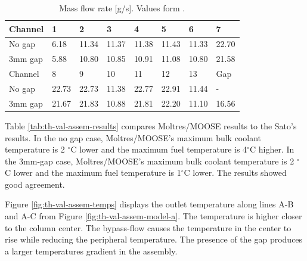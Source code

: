 
\begin{table}[htbp!]
\centering
  \caption{Mass flow rate [g/s]. Values form \cite{sato_computational_2010}.}
  \label{tab:th-val-assem-massflow}
  \begin{tabular}{l|lllllll}
\toprule
Channel & 1 & 2 & 3 & 4 & 5 & 6 & 7 \\
\midrule
No gap  & 6.18 & 11.34 & 11.37 & 11.38 & 11.43 & 11.33 & 22.70 \\
3mm gap & 5.88 & 10.80 & 10.85 & 10.91 & 11.08 & 10.80 & 21.58 \\
\midrule
Channel & 8 & 9 & 10 & 11 & 12 & 13 & Gap \\
\midrule
No gap  & 22.73 & 22.73 & 11.38 & 22.77 & 22.91 & 11.44 & -     \\
3mm gap & 21.67 & 21.83 & 10.88 & 21.81 & 22.20 & 11.10 & 16.56 \\
\bottomrule
\end{tabular}
\end{table}

Table \ref{tab:th-val-assem-results} compares Moltres/MOOSE results to the Sato's results.
In the no gap case, Moltres/MOOSE's maximum bulk coolant temperature is 2 $^{\circ}$C lower and the maximum fuel temperature is 4$^{\circ}$C higher.
In the 3mm-gap case, Moltres/MOOSE's maximum bulk coolant temperature is 2 $^{\circ}$C lower and the maximum fuel temperature is 1$^{\circ}$C lower.
The results showed good agreement.

Figure \ref{fig:th-val-assem-temps} displays the outlet temperature along lines A-B and A-C from Figure \ref{fig:th-val-assem-model-a}.
The temperature is higher closer to the column center.
The bypass-flow causes the temperature in the center to rise while reducing the peripheral temperature.
The presence of the gap produces a larger temperatures gradient in the assembly.


